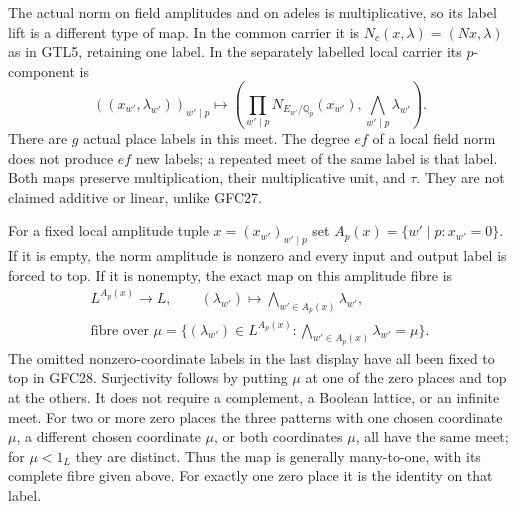 The actual norm on field amplitudes and on adeles is multiplicative,
so its label lift is a different type of map. In the common carrier
it is $N_c(x,\lambda)=(Nx,\lambda)$ as in GTL5, retaining one label.
In the separately labelled local carrier its $p$-component is
\begin{equation}\tag{GFC28}
 ((x_{w'},\lambda_{w'}))_{w'\mid p}\longmapsto
   \left(\prod_{w'\mid p}N_{E_{w'}/\mathbb Q_p}(x_{w'}),
                               \bigwedge_{w'\mid p}\lambda_{w'}\right).
\end{equation}
There are $g$ actual place labels in this meet. The degree $ef$
of a local field norm does not produce $ef$ new labels; a repeated
meet of the same label is that label. Both maps preserve
multiplication, their multiplicative unit, and $\tau$. They are
not claimed additive or linear, unlike GFC27.

For a fixed local amplitude tuple $x=(x_{w'})_{w'\mid p}$ set
$A_p(x)=\{w'\mid p:x_{w'}=0\}$. If it is empty, the norm amplitude
is nonzero and every input and output label is forced to top.
If it is nonempty, the exact map on this amplitude fibre is
\begin{equation}\tag{GFC29}
 \begin{gathered}
 L^{A_p(x)}\longrightarrow L,\qquad
                (\lambda_{w'})\longmapsto\bigwedge_{w'\in A_p(x)}
                                                           \lambda_{w'},\\
 \text{fibre over }\mu=
     \{(\lambda_{w'})\in L^{A_p(x)}:
                       \bigwedge_{w'\in A_p(x)}\lambda_{w'}=\mu\}.
 \end{gathered}
\end{equation}
The omitted nonzero-coordinate labels in the last display have
all been fixed to top in GFC28. Surjectivity follows by putting
$\mu$ at one of the zero places and top at the others. It does
not require a complement, a Boolean lattice, or an infinite meet.
For two or more zero places the three patterns with one chosen
coordinate $\mu$, a different chosen coordinate $\mu$, or both
coordinates $\mu$, all have the same meet; for $\mu<1_L$ they
are distinct. Thus the map is generally many-to-one, with its
complete fibre given above. For exactly one zero place it is
the identity on that label.

